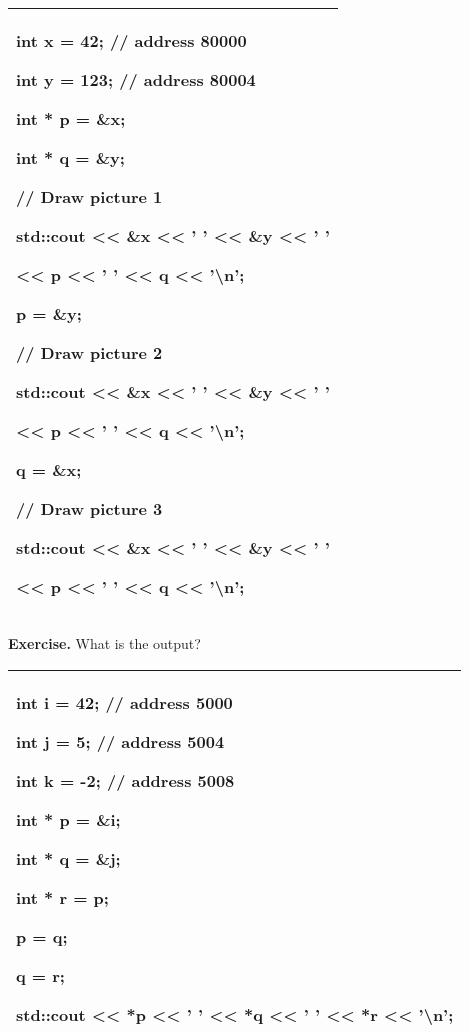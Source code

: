 \documentclass[
]{article}
\begin{document}
\begin{longtable}[]{@{}l@{}}
\toprule
\endhead
\begin{minipage}[t]{0.97\columnwidth}\raggedright
int x = 42; // address 80000

int y = 123; // address 80004

int * p = \&x;

int * q = \&y;

// Draw picture 1

std::cout \textless\textless{} \&x \textless\textless{} ' '
\textless\textless{} \&y \textless\textless{} ' '

\textless\textless{} p \textless\textless{} ' ' \textless\textless{} q
\textless\textless{} '\textbackslash n';

p = \&y;

// Draw picture 2

std::cout \textless\textless{} \&x \textless\textless{} ' '
\textless\textless{} \&y \textless\textless{} ' '

\textless\textless{} p \textless\textless{} ' ' \textless\textless{} q
\textless\textless{} '\textbackslash n';

q = \&x;

// Draw picture 3

std::cout \textless\textless{} \&x \textless\textless{} ' '
\textless\textless{} \&y \textless\textless{} ' '

\textless\textless{} p \textless\textless{} ' ' \textless\textless{} q
\textless\textless{} '\textbackslash n';\strut
\end{minipage}\tabularnewline
\bottomrule
\end{longtable}

\textbf{Exercise.} What is the output?

\begin{longtable}[]{@{}l@{}}
\toprule
\endhead
\begin{minipage}[t]{0.97\columnwidth}\raggedright
int i = 42; // address 5000

int j = 5; // address 5004

int k = -2; // address 5008

int * p = \&i;

int * q = \&j;

int * r = p;

p = q;

q = r;

std::cout \textless\textless{} *p \textless\textless{} ' '
\textless\textless{} *q \textless\textless{} ' ' \textless\textless{} *r
\textless\textless{} '\textbackslash n'; \strut
\end{minipage}\tabularnewline
\bottomrule
\end{longtable}
\end{document}
